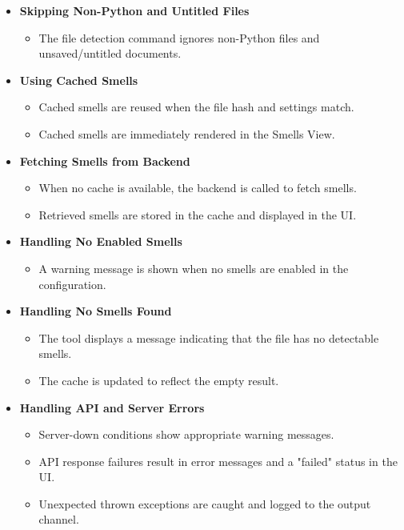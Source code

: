 \documentclass[12pt, titlepage]{article}
\begin{document}
\begin{itemize}
  \item \textbf{Skipping Non-Python and Untitled Files}
    \begin{itemize}
      \item The file detection command ignores non-Python files and unsaved/untitled documents.
    \end{itemize}

  \item \textbf{Using Cached Smells}
    \begin{itemize}
      \item Cached smells are reused when the file hash and settings match.
      \item Cached smells are immediately rendered in the Smells View.
    \end{itemize}

  \item \textbf{Fetching Smells from Backend}
    \begin{itemize}
      \item When no cache is available, the backend is called to fetch smells.
      \item Retrieved smells are stored in the cache and displayed in the UI.
    \end{itemize}

  \item \textbf{Handling No Enabled Smells}
    \begin{itemize}
      \item A warning message is shown when no smells are enabled in the configuration.
    \end{itemize}

  \item \textbf{Handling No Smells Found}
    \begin{itemize}
      \item The tool displays a message indicating that the file has no detectable smells.
      \item The cache is updated to reflect the empty result.
    \end{itemize}

  \item \textbf{Handling API and Server Errors}
    \begin{itemize}
      \item Server-down conditions show appropriate warning messages.
      \item API response failures result in error messages and a "failed" status in the UI.
      \item Unexpected thrown exceptions are caught and logged to the output channel.
    \end{itemize}


\end{itemize}
\end{document}
